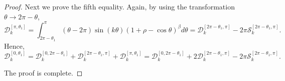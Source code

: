 \documentclass[10pt,a4paper]{amsart}
\begin{document}
\begin{proof}
Next we prove the fifth equality. Again, by using the transformation $\theta \to 2\pi-\theta$,
\begin{equation*}
\mathcal{D}_{k}^{\left[\pi,\theta_{1}\right]}=\int_{2\pi-\theta_1}^{\pi}(\theta-2\pi)\sin(k\theta)\left(1+\rho-\cos\theta\right)^{\beta}d\theta=\mathcal{D}_{k}^{\left[2\pi-\theta_{1},\pi\right]}-2\pi\mathcal{S}_{k}^{\left[2\pi-\theta_{1},\pi\right]}.
\end{equation*}
Hence,
 \begin{equation*}
\mathcal{D}_{k}^{\left[0,\theta_{1}\right]}=\mathcal{D}_{k}^{\left[0,2\pi-\theta_1\right]}+\mathcal{D}_{k}^{\left[2\pi-\theta_1,\pi\right]}+\mathcal{D}_{k}^{\left[\pi,\theta_{1}\right]}=\mathcal{D}_{k}^{\left[0,2\pi-\theta_1\right]}+2\mathcal{D}_{k}^{\left[2\pi-\theta_{1},\pi\right]}-2\pi\mathcal{S}_{k}^{\left[2\pi-\theta_{1},\pi\right]}.
\end{equation*}


The proof is complete. \end{proof}
\end{document}
